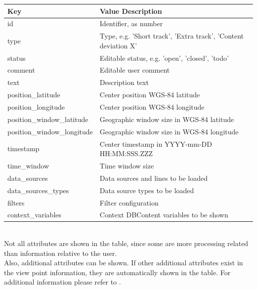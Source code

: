 \begin{center}
 \begin{table}[H]
  \begin{tabularx}{\textwidth}{ | l | X | }
    \hline
    \textbf{Key} & \textbf{Value Description} \\ \hline
    id & Identifier, as number \\ \hline
    type & Type, e.g. 'Short track', 'Extra track', 'Content deviation X'  \\ \hline
    status & Editable status, e.g. 'open', 'closed', 'todo' \\ \hline
    comment & Editable user comment \\ \hline
    text & Description text \\ \hline
    position\_latitude & Center position WGS-84 latitude \\ \hline
    position\_longitude & Center position WGS-84 longitude \\ \hline
    position\_window\_latitude & Geographic window size in WGS-84 latitude  \\ \hline
    position\_window\_longitude & Geographic window size in WGS-84 longitude  \\ \hline
    timestamp & Center timestamp in YYYY-mm-DD HH:MM:SSS.ZZZ  \\ \hline
    time\_window & Time window size \\ \hline
    data\_sources & Data sources and lines to be loaded \\ \hline
    data\_sources\_types & Data source types to be loaded \\ \hline
    filters & Filter configuration \\ \hline
    context\_variables & Context DBContent variables to be shown \\ \hline
\end{tabularx}
\end{table}
\end{center}
\ \\

Not all attributes are shown in the table, since some are more processing related than information relative to the user. \\

Also, additional attributes can be shown. If other additional attributes exist in the view point information, they are automatically shown in the table. For additional information please refer to . \\

